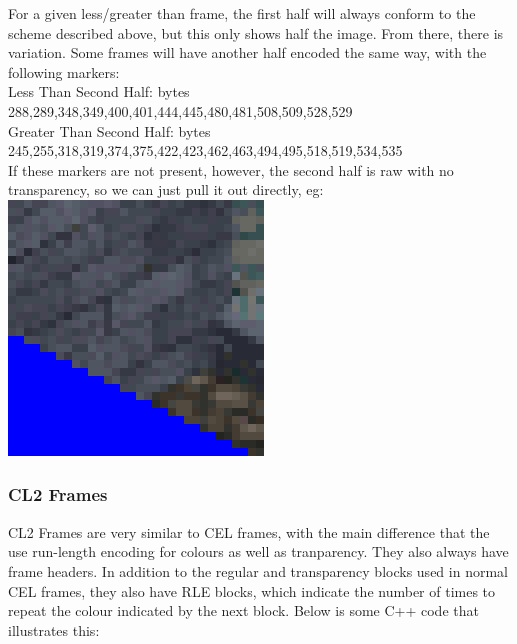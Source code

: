 \documentclass[a4paper]{article}
\begin{document}
\begin{itemize}
	For a given less/greater than frame, the first half will always conform to the scheme described above, but this only shows half the image.
	From there, there is variation. Some frames will have another half encoded the same way, with the following markers:\\
	Less Than Second Half: bytes 288,289,348,349,400,401,444,445,480,481,508,509,528,529\\
	Greater Than Second Half: bytes 245,255,318,319,374,375,422,423,462,463,494,495,518,519,534,535\\
	
	If these markers are not present, however, the second half is raw with no transparency, so we can just pull it out directly, eg:\\
	\includegraphics[scale=0.5]{rawtop}
\end{itemize}

\newpage

\subsubsection{CL2 Frames}
	CL2 Frames are very similar to CEL frames, with the main difference that the use run-length encoding for colours as well as tranparency. They also always have frame headers.
   In addition to the regular and transparency blocks used in normal CEL frames, they also have RLE blocks, which indicate the number of times to repeat the colour indicated by the next block.
   Below is some C++ code that illustrates this:
   
\end{document}
